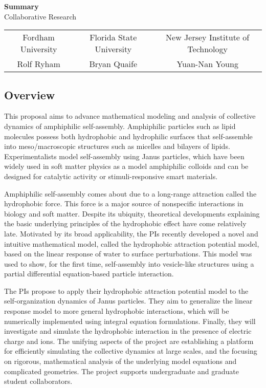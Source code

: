 \documentclass{article}
\begin{document}
\begin{center}
{\bf \Large Summary}\\ Collaborative Research
\begin{tabular}{ccc}\\ 
Fordham University & Florida State University& New Jersey Institute of Technology\\
Rolf Ryham &            Bryan Quaife &              Yuan-Nan Young
\end{tabular}

\end{center}

\subsection*{Overview}
This proposal aims to advance mathematical modeling and analysis of collective dynamics of amphiphilic self-assembly.  Amphiphilic particles such as lipid molecules possess both hydrophobic and hydrophilic surfaces
that self-assemble into meso/macroscopic structures such as micelles and bilayers of lipids.  Experimentalists model self-assembly
using Janus particles, which have been widely used in soft matter physics as a model amphiphilic colloids and can be designed for catalytic activity or stimuli-responsive smart materials.

Amphiphilic self-assembly comes about due to a long-range attraction called the hydrophobic force.  This force is a major source of nonspecific interactions in biology and soft matter. Despite its ubiquity, theoretical developments explaining the basic underlying principles of the hydrophobic effect have come relatively late. Motivated by its broad applicability, the PIs recently developed a novel and intuitive mathematical model, called the hydrophobic attraction potential model, based on the linear response of water to surface perturbations. This model was used to show, for the first time, self-assembly into vesicle-like structures using a partial differential equation-based particle interaction.

The PIs propose to apply their hydrophobic attraction potential model to the self-organization dynamics of Janus particles.  They aim to generalize the linear response model to more general hydrophobic interactions, which will be numerically implemented using integral equation formulations.  Finally, they will investigate and simulate the hydrophobic interaction in the presence of electric charge and ions. The unifying aspects of the project are establishing a platform for efficiently simulating the collective dynamics at large scales, and the focusing on rigorous, mathematical analysis of the underlying model equations and complicated geometries.  The project supports undergraduate and graduate student collaborators. 
\end{document}
